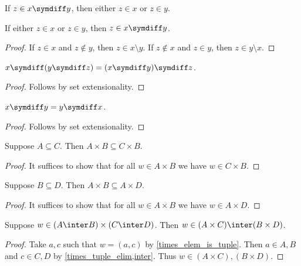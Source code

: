 \begin{proposition}%
\label{symdiff_implies_xor_in}
    If $z\in x\symdiff y$, then either $z\in x$ or $z\in y$.
\end{proposition}

\begin{proposition}%
\label{xor_in_implies_symdiff}
    If either $z\in x$ or $z\in y$, then $z\in x\symdiff y$.
\end{proposition}
\begin{proof}
    If $z\in x$ and $z\not\in y$, then $z\in x\setminus y$.
    If $z\not\in x$ and $z\in y$, then $z\in y\setminus x$.
\end{proof}

\begin{proposition}%
\label{symdiff_assoc}
    $x\symdiff (y\symdiff z) = (x\symdiff y)\symdiff z$.
\end{proposition}
\begin{proof}
    Follows by set extensionality.
\end{proof}

\begin{proposition}%
\label{symdiff_comm}
    $x\symdiff y = y\symdiff x$.
\end{proposition}
\begin{proof}
    Follows by set extensionality.
\end{proof}
\begin{proposition}\label{times_subseteq_left}
    Suppose $A\subseteq C$. Then $A\times B\subseteq C\times B$.
\end{proposition}
\begin{proof}
    It suffices to show that for all $w\in A\times B$ we have $w\in C\times B$.
\end{proof}

\begin{proposition}\label{times_subseteq_right}
    Suppose $B\subseteq D$. Then $A\times B\subseteq A\times D$.
\end{proposition}
\begin{proof}
    It suffices to show that for all $w\in A\times B$ we have $w\in A\times D$.
\end{proof}

\begin{proposition}\label{inter_times_intro}
    Suppose $w\in(A\inter B)\times (C\inter D)$.
    Then $w\in(A\times C)\inter (B\times D)$.
\end{proposition}
\begin{proof}
    Take $a,c$ such that $w = (a, c)$
        by \cref{times_elem_is_tuple}.
    Then $a\in A, B$ and $c\in C,D$
        by \cref{times_tuple_elim,inter}.
    Thus $w\in (A\times C), (B\times D)$.
\end{proof}

